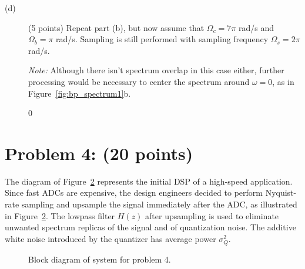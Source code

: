\documentclass[10pt]{article}
\def\SOLUTIONS{1} %
\begin{document}
\begin{description}
\item[(d)] (5 points) Repeat part (b), but now assume that $\Omega_c = 7\pi$ rad/s and $\Omega_b = \pi$ rad/s. Sampling is still performed with sampling frequency $\Omega_s = 2\pi$ rad/s. 

\textit{Note:} Although there isn't spectrum overlap in this case either, further processing would be necessary to center the spectrum around $\omega = 0$, as in Figure~\ref{fig:bp_spectrum1}b.

\begin{figure}[!h]
\centering
	\def\SolD{1}
	\resizebox{\textwidth}{!}{} \label{fig:bp_spectrum_sol1}
\end{figure}
\if\SOLUTIONS0\vspace{5cm}
\fi

\end{description}

\newpage
\section*{Problem 4: (20 points)}
The diagram of Figure~\ref{fig:sampling_diagram} represents the initial DSP of a high-speed application. Since fast ADCs are expensive, the design engineers decided to perform Nyquist-rate sampling and upsample the signal immediately after the ADC, as illustrated in Figure~\ref{fig:sampling_diagram}. The lowpass filter $H(z)$ after upsampling is used to eliminate unwanted spectrum replicas of the signal and of quantization noise. The additive white  noise introduced by the quantizer has average power $\sigma_Q^2$.

\begin{figure}[!h]
\centering
	\resizebox{\textwidth}{!}{} 
    \caption{Block diagram of system for problem 4.}\label{fig:sampling_diagram}
\end{figure}
\end{document}
